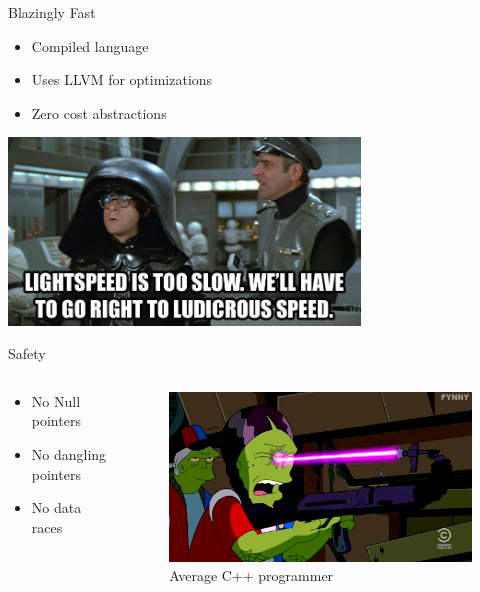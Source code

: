 \documentclass[aspectratio=1610,t]{beamer}
\begin{document}
\begin{frame}[c]{Blazingly Fast}
  \begin{itemize}
    \item Compiled language
    \item Uses LLVM for optimizations
    \item Zero cost abstractions
  \end{itemize}
  \includegraphics[width=0.7\textwidth]{./spaceballs-meme.jpg}
\end{frame}


\begin{frame}[c]{Safety}
  \begin{columns}[onlytextwidth]
    \begin{column}{.3\textwidth}
      \begin{itemize}
        \item No Null pointers
        \item No dangling pointers
        \item No data races
      \end{itemize}
    \end{column}
    \begin{column}{.7\textwidth}
      \begin{figure}
        \includegraphics[width=\textwidth]{./average_cpp_programmer.png}
        \caption{Average C++ programmer}
      \end{figure}
    \end{column}
  \end{columns}
\end{frame}
\end{document}
